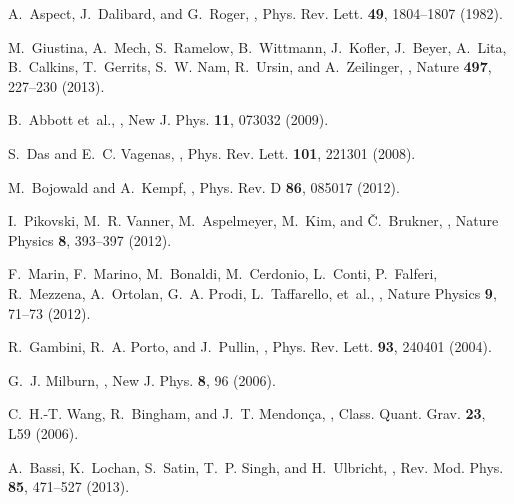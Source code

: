 \documentclass[12pt]{article}
\begin{document}
\begin{thebibliography}{100}
A.~Aspect, J.~Dalibard, and G.~Roger,
,
\newblock Phys. Rev. Lett. {\bf 49}, 1804--1807 (1982).

M.~Giustina, A.~Mech, S.~Ramelow, B.~Wittmann, J.~Kofler, J.~Beyer, A.~Lita,
  B.~Calkins, T.~Gerrits, S.~W. Nam, R.~Ursin, and A.~Zeilinger,
,
\newblock Nature {\bf 497}, 227--230 (2013).

B.~Abbott et~al.,
,
\newblock New J. Phys. {\bf 11}, 073032 (2009).

S.~Das and E.~C. Vagenas,
,
\newblock Phys. Rev. Lett. {\bf 101}, 221301 (2008).

M.~Bojowald and A.~Kempf,
,
\newblock Phys. Rev. D {\bf 86}, 085017 (2012).

I.~Pikovski, M.~R. Vanner, M.~Aspelmeyer, M.~Kim, and {\v{C}}.~Brukner,
,
\newblock Nature Physics {\bf 8}, 393--397 (2012).

F.~Marin, F.~Marino, M.~Bonaldi, M.~Cerdonio, L.~Conti, P.~Falferi, R.~Mezzena,
  A.~Ortolan, G.~A. Prodi, L.~Taffarello, et~al.,
,
\newblock Nature Physics {\bf 9}, 71--73 (2012).

R.~Gambini, R.~A. Porto, and J.~Pullin,
,
\newblock Phys. Rev. Lett. {\bf 93}, 240401 (2004).

G.~J. Milburn,
,
\newblock New J. Phys. {\bf 8}, 96 (2006).

C.~H.-T. Wang, R.~Bingham, and J.~T. Mendonça,
,
\newblock Class. Quant. Grav. {\bf 23}, L59 (2006).

A.~Bassi, K.~Lochan, S.~Satin, T.~P. Singh, and H.~Ulbricht,
,
\newblock Rev. Mod. Phys. {\bf 85}, 471--527 (2013).


\end{thebibliography}
\end{document}
